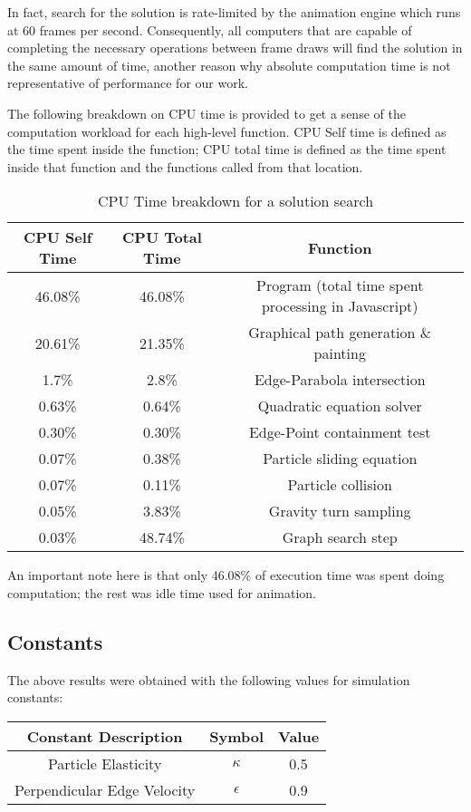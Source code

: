 In fact, search for the solution is rate-limited by the animation engine which runs at 60 frames per second. Consequently, all computers that are capable of completing the necessary operations between frame draws will find the solution in the same amount of time, another reason why absolute computation time is not representative of performance for our work.

The following breakdown on CPU time is provided to get a sense of the computation workload for each high-level function. CPU Self time is defined as the time spent inside the function; CPU total time is defined as the time spent inside that function and the functions called from that location.

\begin{table}[H]
\label{resultsTable}
\begin{tabular}{|c|c|c|}
\hline
CPU Self Time & CPU Total Time & Function \\ \hline
46.08\% & 46.08\% & Program (total time spent processing in Javascript) \\
20.61\% & 21.35\% & Graphical path generation \& painting \\
1.7\% & 2.8\% & Edge-Parabola intersection \\
0.63\% & 0.64\% & Quadratic equation solver \\
0.30\% & 0.30\% & Edge-Point containment test \\
0.07\% & 0.38\% & Particle sliding equation \\
0.07\% & 0.11\% & Particle collision \\
0.05\% & 3.83\% & Gravity turn sampling \\
0.03\% & 48.74\% & Graph search step \\
\hline
\end{tabular}
\caption{CPU Time breakdown for a solution search}
\end{table}

An important note here is that only 46.08\% of execution time was spent doing computation; the rest was idle time used for animation.

  \subsection{Constants}

The above results were obtained with the following values for simulation constants:

\begin{table}[H]\label{constantsTable}
\begin{tabular}{|c|c|c|}
\hline
Constant Description & Symbol & Value \\ \hline
Particle Elasticity & $\kappa$ & 0.5 \\
Perpendicular Edge Velocity & $\epsilon$ & 0.9\\
\end{tabular}
\end{table}


